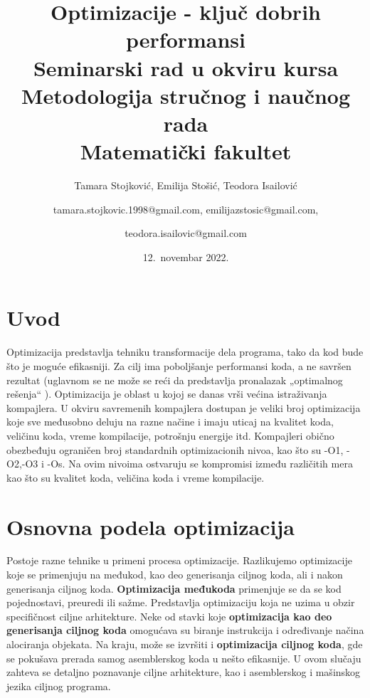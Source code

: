 \documentclass[a4paper]{article}
\begin{document}
\title{Optimizacije - ključ dobrih performansi\\ \small{Seminarski rad u okviru kursa\\Metodologija stručnog i naučnog rada\\ Matematički fakultet}}

\author{Tamara Stojković, Emilija Stošić, Teodora Isailović \and tamara.stojkovic.1998@gmail.com, emilijazstosic@gmail.com, \and teodora.isailovic@gmail.com}
\date{12.~novembar 2022.}

\maketitle

\tableofcontents

\newpage

\section{Uvod}
\label{sec:uvod}
Optimizacija predstavlja tehniku transformacije dela programa,  tako da kod bude što je moguće efikasniji. 
Za cilj ima poboljšanje performansi koda, a ne savršen rezultat (uglavnom se ne može se reći da predstavlja pronalazak „optimalnog rešenja“ ). 
Optimizacija je oblast u kojoj se danas vrši većina istraživanja kompajlera. 
U okviru savremenih kompajlera dostupan je veliki broj optimizacija koje sve međusobno deluju na razne načine i imaju uticaj na kvalitet koda, veličinu koda, vreme kompilacije, potrošnju energije itd. Kompajleri obično obezbeđuju ograničen broj  standardnih optimizacionih nivoa, kao što su -O1, -O2,-O3 i -Os. Na ovim nivoima ostvaruju se kompromisi između  različitih mera kao što su kvalitet koda, veličina koda i vreme kompilacije. \cite{uvod}

\section{Osnovna podela optimizacija}
\label{sec:podela}
Postoje razne tehnike u primeni procesa optimizacije. Razlikujemo optimizacije koje se primenjuju na međukod,  kao deo generisanja ciljnog koda, ali i nakon generisanja ciljnog koda.
\textbf{Optimizacija međukoda} primenjuje se da se kod pojednostavi, preuredi ili sažme. Predstavlja optimizaciju koja ne uzima u obzir specifičnost ciljne arhitekture.
Neke od stavki koje \textbf{optimizacija kao deo generisanja ciljnog koda} omogućava su biranje instrukcija i određivanje načina alociranja objekata. Na kraju, može se izvršiti i \textbf{optimizacija ciljnog koda}, gde se pokušava prerada samog asemblerskog koda u nešto efikasnije. 
U ovom slučaju zahteva se detaljno poznavanje ciljne arhitekture, kao i asemblerskog i mašinskog jezika ciljnog programa. \cite{osnovnaPodela}
\end{document}

